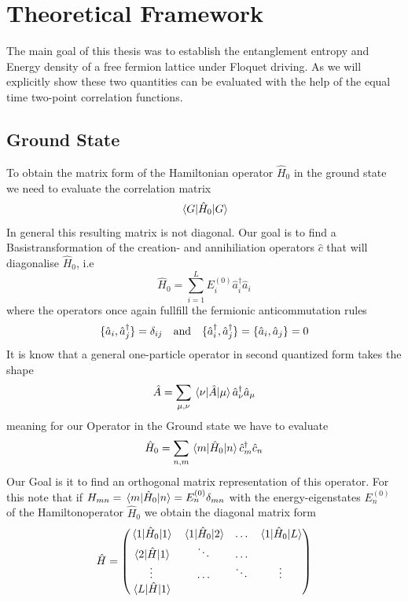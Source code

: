 \documentclass[11pt, a4paper]{article}
\theoremstyle{definition} %
\begin{document}
\section{Theoretical Framework}
	The main goal of this thesis was to establish the entanglement entropy and Energy density of a free fermion lattice under Floquet driving. As we will explicitly show these two quantities can be evaluated with the help of the equal time two-point correlation functions.

	\subsection{Ground State}
	To obtain the matrix form of the Hamiltonian operator $\hat{H}_0$ in the ground state we need to evaluate the correlation matrix
	\begin{equation}
		\mel{G}{\hat{H}_0}{G}
	\end{equation}
	In general this resulting matrix is not diagonal. Our goal is to find a Basistransformation of the creation- and annihiliation operators $\hat{c}$ that will diagonalise $\hat{H}_0$, i.e
	\begin{equation}
		\hat{H}_0 = \sum_{i=1}^L E_i^{(0)} \hat{a}_i^\dagger \hat{a}_i
	\end{equation}
	where the operators once again fullfill the fermionic anticommutation rules
	\begin{equation}
		\{ \hat{a}_i,\hat{a}_j^\dagger \} = \delta_{ij} \qq{and} \{\hat{a}_i^\dagger, \hat{a}_j^\dagger\} = \{\hat{a}_i,\hat{a}_j  \} =0
	\end{equation}
	It is know that a general one-particle operator in second quantized form takes the shape
	\begin{equation}
		\hat{A} = \sum_{\mu, \nu} \mel{\nu}{\hat{A}}{\mu} \hat{a}_\nu^\dagger \hat{a}_\mu
	\end{equation}
	meaning for our Operator in the Ground state we have to evaluate
	\begin{equation}
		\hat{H}_0 = \sum_{n, m} \mel{m}{\hat{H}_0}{n} \hat{c}_m^\dagger \hat{c}_n
	\end{equation}
	Our Goal is it to find an orthogonal matrix representation of this operator. For this note that if $H_{mn} = \mel{m}{\hat{H}_0}{n} = E_n^{(0)} \delta_{mn} $ with the energy-eigenstates $E_n^{(0)}$ of the Hamiltonoperator $\hat{H}_0$ we obtain the diagonal matrix form
	\begin{equation}
	\hat{H} = 
	\begin{pmatrix}
 		\mel{1}{\hat{H}_0}{1} & \mel{1}{\hat{H}_0}{2} & \dots & \mel{1}{\hat{H}_0}{L} \\
 		\mel{2}{\hat{H}}{1} & \ddots &\dots \\
 		\vdots & \dots & \ddots & \vdots \\
 		\mel{L}{\hat{H}}{1}
 	\end{pmatrix}
	\end{equation}
\end{document}
